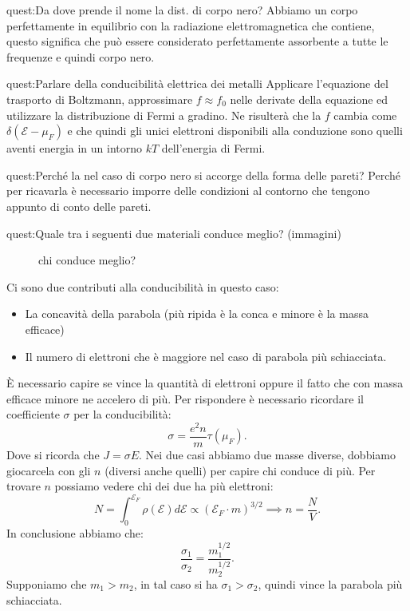 \begin{quest}{quest:Da dove prende il nome la dist. di corpo nero?}
    Abbiamo un corpo perfettamente in equilibrio con la radiazione elettromagnetica che contiene, questo significa che può essere considerato perfettamente assorbente a tutte le frequenze e quindi corpo nero. 
\end{quest}
\begin{quest}{quest:Parlare della conducibilità elettrica dei metalli}
    Applicare l'equazione del trasporto di Boltzmann, approssimare $f\approx f_0$ nelle derivate della equazione ed utilizzare la distribuzione di Fermi a gradino. Ne risulterà che la $f$ cambia come $\delta (\mathcal{E}-\mu_F)$ e che quindi gli unici elettroni disponibili alla conduzione sono quelli aventi energia in un intorno $kT$ dell'energia di Fermi.
\end{quest}
\begin{quest}{quest:Perché la  nel caso di corpo nero si accorge della forma delle pareti?}
Perché per ricavarla è necessario imporre delle condizioni al contorno che tengono appunto di conto delle pareti. 
\end{quest}

\begin{quest}{quest:Quale tra i seguenti due materiali conduce meglio? (immagini) }
\begin{figure}[H]
    \centering
    \caption{chi conduce meglio?}
    \label{fig:chi-conduce-meglio?}
\end{figure}
Ci sono due contributi alla conducibilità in questo caso: 
\begin{itemize}
    \item La concavità della parabola (più ripida è la conca e minore è la massa efficace)
    \item Il numero di elettroni che è maggiore nel caso di parabola più schiacciata.
\end{itemize}
È necessario capire se vince la quantità di elettroni oppure il fatto che con massa efficace minore ne accelero di più. 
Per rispondere è necessario ricordare il coefficiente $\sigma$ per la conducibilità:
\[
    \sigma  = \frac{e^2n}{m}\tau (\mu_F) 
.\] 
Dove si ricorda che $J = \sigma E$. Nei due casi abbiamo due masse diverse, dobbiamo giocarcela con gli $n$ (diversi anche quelli) per capire chi conduce di più.
Per trovare $n$ possiamo vedere chi dei due ha più elettroni: 
\[
    N = \int_{0}^{\mathcal{E}_F} \rho (\mathcal{E}) d\mathcal{E}\propto\left(\mathcal{E}_F\cdot m\right)^{3 /2} \implies  n = \frac{N}{V}
.\] 
In conclusione abbiamo che:
\[
    \frac{\sigma_1}{\sigma_2} = \frac{m_1^{1 /2}}{m_2^{1 /2}}
.\] 
Supponiamo che $m_1>m_2$, in tal caso si ha $\sigma_1>\sigma_2$, quindi vince la parabola più schiacciata.	
\end{quest}

